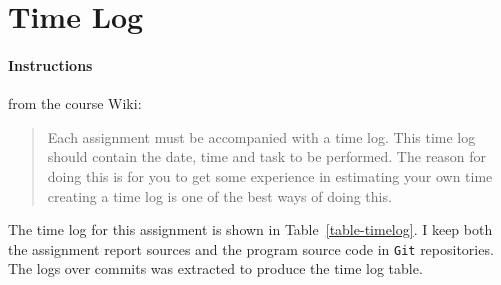 %
%
%
%


\section{Time Log}\label{time-log}

\paragraph{Instructions}\label{task-3-instructions}
from the course Wiki\cite{1dv600:lab1:instructions}:

\begin{quote}
  Each assignment must be accompanied with a time log. This time log should
  contain the date, time and task to be performed. The reason for doing this is
  for you to get some experience in estimating your own time creating a time
  log is one of the best ways of doing this.
\end{quote}


The time log for this assignment is shown in Table~\ref{table-timelog}.  I keep
both the assignment report \latex sources and the program source code in
\texttt{Git} repositories. The logs over commits was extracted to produce the
time log table.


